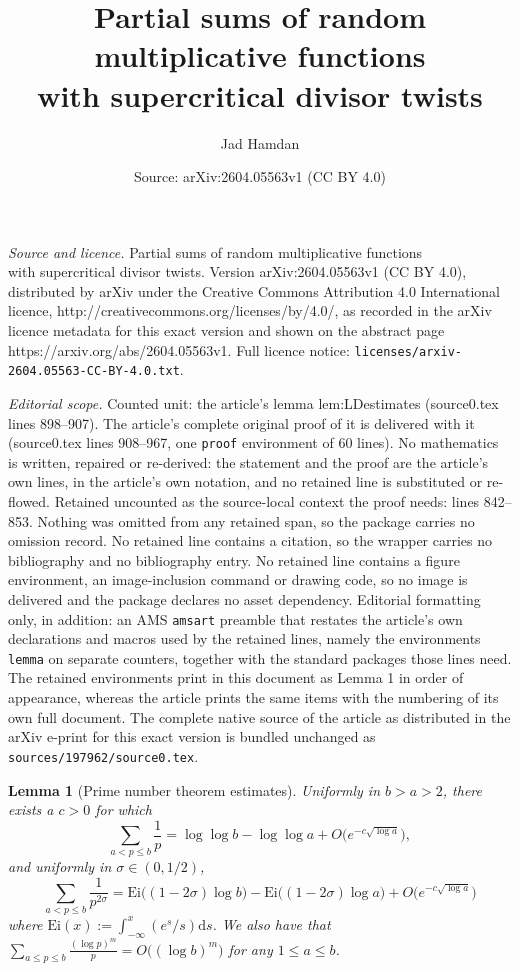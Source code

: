\documentclass[10pt,a4paper]{amsart}
\title{Partial sums of random multiplicative functions \\with supercritical divisor twists}
\author{Jad Hamdan}
\date{Source: arXiv:2604.05563v1 (CC BY 4.0)}
\newtheorem{lemma}{Lemma}
\begin{document}
\maketitle

\noindent\emph{Source and licence.} Partial sums of random multiplicative functions \\with supercritical divisor twists. Version arXiv:2604.05563v1 (CC BY 4.0), distributed by arXiv under the Creative Commons Attribution 4.0 International licence, http://creativecommons.org/licenses/by/4.0/, as recorded in the arXiv licence metadata for this exact version and shown on the abstract page https://arxiv.org/abs/2604.05563v1. Full licence notice: \texttt{licenses/arxiv-2604.05563-CC-BY-4.0.txt}.\par\smallskip

\noindent\textit{Editorial scope.} Counted unit: the article's lemma lem:LDestimates (source0.tex lines 898--907). The article's complete original proof of it is delivered with it (source0.tex lines 908--967, one \texttt{proof} environment of 60 lines). No mathematics is written, repaired or re-derived: the statement and the proof are the article's own lines, in the article's own notation, and no retained line is substituted or re-flowed.  Retained uncounted as the source-local context the proof needs: lines 842--853.  Nothing was omitted from any retained span, so the package carries no omission record.  No retained line contains a citation, so the wrapper carries no bibliography and no bibliography entry.  No retained line contains a figure environment, an image-inclusion command or drawing code, so no image is delivered and the package declares no asset dependency.  Editorial formatting only, in addition: an AMS \texttt{amsart} preamble that restates the article's own declarations and macros used by the retained lines, namely the environments \texttt{lemma} on separate counters, together with the standard packages those lines need.  The retained environments print in this document as Lemma 1 in order of appearance, whereas the article prints the same items with the numbering of its own full document.  The complete native source of the article as distributed in the arXiv e-print for this exact version is bundled unchanged as \texttt{sources/197962/source0.tex}.
\begin{lemma}[Prime number theorem estimates]\label{lem:PNT}
Uniformly in $b>a>2$, there exists a $c>0$ for which
    \begin{equation}
        \sum_{a<p\leq b} \frac{1}{p}= \log\log b-\log\log a+O\big(e^{-c\sqrt{\log a}}\big),
    \end{equation}
and uniformly in $\sigma\in (0,1/2)$, 
\begin{equation}
    \sum_{a<p\leq b} \frac{1}{p^{2\sigma}} = \mathrm{Ei}\big((1-2\sigma)\log b\big)-\mathrm{Ei}\big((1-2\sigma)\log a\big)+O\big(e^{-c\sqrt{\log a}}\big)
\end{equation}
where $\mathrm{Ei}(x):=\int_{-\infty}^x(e^{s}/s)\mathrm{d}s$.
We also have that $\sum_{a\leq p\leq b}\frac{(\log p)^m}{p}=O\big((\log b)^m\big)$ for any $1\leq a\leq b$.
\end{lemma}
\end{document}
